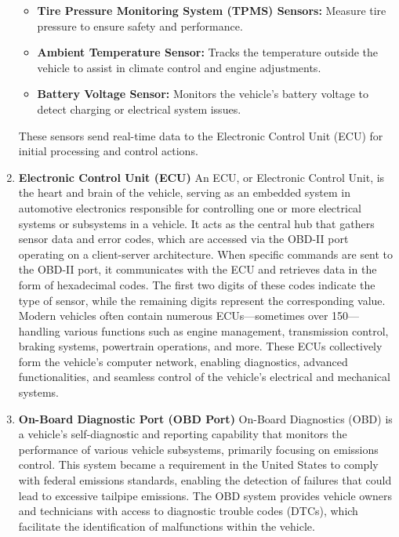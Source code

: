 \begin{enumerate}
\begin{itemize}
        \item \textbf{Tire Pressure Monitoring System (TPMS) Sensors:} Measure tire pressure to ensure safety and performance.
        \item \textbf{Ambient Temperature Sensor:} Tracks the temperature outside the vehicle to assist in climate control and engine adjustments.
        \item \textbf{Battery Voltage Sensor:} Monitors the vehicle's battery voltage to detect charging or electrical system issues.
    \end{itemize}
    These sensors send real-time data to the Electronic Control Unit (ECU) for initial processing and control actions.

    \item \textbf{Electronic Control Unit (ECU)} An ECU, or Electronic Control Unit, is the heart and brain of the vehicle, serving as an embedded system in automotive electronics responsible for controlling one or more electrical systems or subsystems in a vehicle. It acts as the central hub that gathers sensor data and error codes, which are accessed via the OBD-II port operating on a client-server architecture. When specific commands are sent to the OBD-II port, it communicates with the ECU and retrieves data in the form of hexadecimal codes. The first two digits of these codes indicate the type of sensor, while the remaining digits represent the corresponding value.\\Modern vehicles often contain numerous ECUs—sometimes over 150—handling various functions such as engine management, transmission control, braking systems, powertrain operations, and more. These ECUs collectively form the vehicle's computer network, enabling diagnostics, advanced functionalities, and seamless control of the vehicle's electrical and mechanical systems.
    \item \textbf{On-Board Diagnostic Port (OBD Port)} On-Board Diagnostics (OBD) is a vehicle's self-diagnostic and reporting capability that monitors the performance of various vehicle subsystems, primarily focusing on emissions control. This system became a requirement in the United States to comply with federal emissions standards, enabling the detection of failures that could lead to excessive tailpipe emissions. The OBD system provides vehicle owners and technicians with access to diagnostic trouble codes (DTCs), which facilitate the identification of malfunctions within the vehicle.\\[1cm]
    

\end{enumerate}
